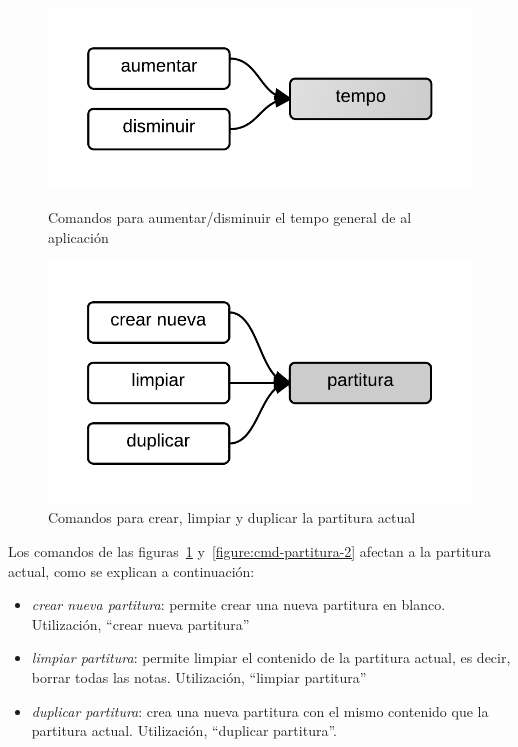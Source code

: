 \begin{figure}[H]
\begin{minipage}[b]{0.5\linewidth}
\centering
\includegraphics[width=0.6\linewidth]{./graphics/cmd-tempo.png}
\caption{Comandos para aumentar/disminuir el tempo general de al aplicaci\'on}
\label{figure:cmd-tempo}
\end{minipage}
\quad
\begin{minipage}[b]{0.5\linewidth}
\centering
\includegraphics[width=0.6\linewidth]{./graphics/partitura-1.png}
\caption{Comandos para crear, limpiar y duplicar la partitura actual}
\label{figure:cmd-partitura-1}
\end{minipage}
\end{figure}

Los comandos de las figuras~\ref{figure:cmd-partitura-1} y~\ref{figure:cmd-partitura-2} afectan a
la partitura actual, como se explican a continuaci\'on:

\begin{itemize}
    \item \emph{crear nueva  partitura}:  permite crear una nueva partitura en blanco. Utilizaci\'on, ``crear nueva partitura''
    \item \emph{limpiar  partitura}: permite limpiar el contenido de la partitura actual, es decir, borrar todas las notas. Utilizaci\'on, ``limpiar partitura''
    \item \emph{duplicar partitura}: crea una nueva partitura con el mismo contenido que la partitura actual. Utilizaci\'on, ``duplicar partitura''.
\end{itemize}

